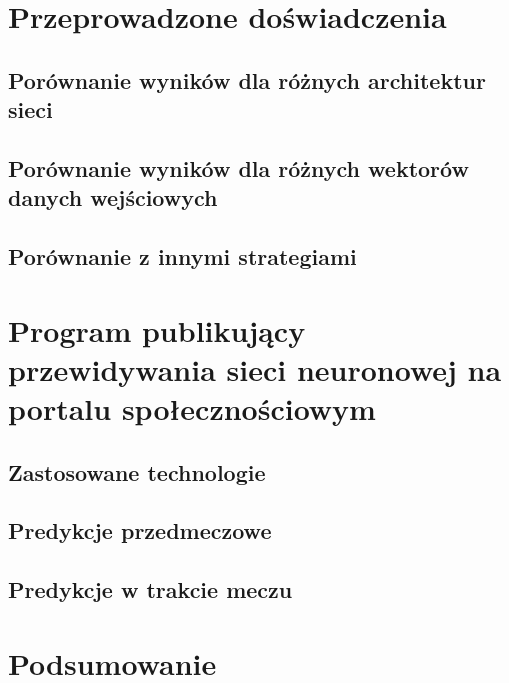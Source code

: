 \chapter{Przeprowadzone doświadczenia}
\section{Porównanie wyników dla różnych architektur sieci}
\section{Porównanie wyników dla różnych wektorów danych wejściowych}
\section{Porównanie z innymi strategiami}

\chapter{Program publikujący przewidywania sieci neuronowej na portalu społecznościowym}
\section{Zastosowane technologie}
\section{Predykcje przedmeczowe}
\section{Predykcje w trakcie meczu}

\chapter{Podsumowanie}

